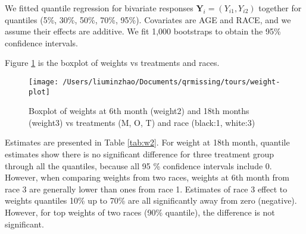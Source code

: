 \documentclass[12pt]{article}
\begin{document}
We  fitted quantile regression  for bivariate  responses
$\bm Y_i = (Y_{i1}, Y_{i2})$ together for
quantiles (5\%, 30\%, 50\%, 70\%, 95\%). Covariates are AGE
and RACE, and we assume their effects are additive.
We fit 1,000 bootstraps to obtain the
95\% confidence intervals.

Figure \ref{fig:tours} is the boxplot of weights vs treatments and
races.

\begin{figure}[htb]
  \centerline{\texttt{[image: /Users/liuminzhao/Documents/qrmissing/tours/weight-plot]}}
  \caption[]{\label{fig:tours} Boxplot of weights at 6th month
    (weight2) and 18th months (weight3) vs treatments (M, O, T) and
    race (black:1, white:3)}
\end{figure}

Estimates are presented in Table \ref{tab:w2}. For weight at 18th month,
quantile estimates show there is no significant difference for three
treatment group through all the quantiles, because all 95 \%
confidence intervals include 0. However, when comparing weights from
two races, weights at 6th month from race 3 are generally lower than
ones from race 1. Estimates of race 3 effect to weights quantiles 10\%
up to 70\% are all significantly away from zero (negative). However,
for top weights of two races (90\% quantile), the difference is not
significant.
\end{document}
